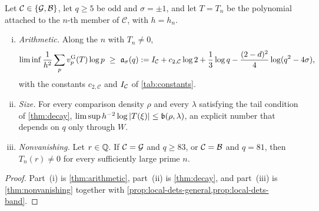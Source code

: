 \begin{theorem}\label{thm:three-estimates}
Let $\mathcal C\in\{\mathcal{G},\mathcal{B}\}$, let $q\ge5$ be odd and $\sigma=\pm1$, and let
$T=T_n$ be the polynomial attached to the $n$-th member of $\mathcal C$, with $h=h_n$.
\begin{enumerate}[(i)]
\item \emph{Arithmetic.} Along the $n$ with $T_n\ne0$,
\[
  \liminf\frac{1}{h^2}\sum_p\vG p(T)\log p\ \ge\ \aconst_\sigma(q):=
  \Iprof_{\mathcal C}+c_{2,\mathcal C}\log2+\frac13\log q-\frac{(2-d)^2}4\log(q^2-4\sigma),
\]
with the constants $c_{2,\mathcal C}$ and $I_{\mathcal C}$ of \cref{tab:constants}.
\item \emph{Size.} For every comparison density $\rho$ and every $\lambda$ satisfying the tail
condition of \cref{thm:decay}, $\limsup h^{-2}\log\left\lvert T(\xi)\right\rvert\le\mathfrak{b}(\rho,\lambda)$, an
explicit number that depends on $q$ only through $W$.
\item \emph{Nonvanishing.} Let $r\in\mathbb{Q}$. If $\mathcal C=\mathcal{G}$ and $q\ge83$, or
$\mathcal C=\mathcal{B}$ and $q=81$, then $T_n(r)\ne0$ for every sufficiently large prime $n$.
\end{enumerate}
\end{theorem}

\begin{proof}
Part~(i) is \cref{thm:arithmetic}, part~(ii) is \cref{thm:decay}, and part~(iii) is
\cref{thm:nonvanishing} together with \cref{prop:local-dets-general,prop:local-dets-band}.
\end{proof}

